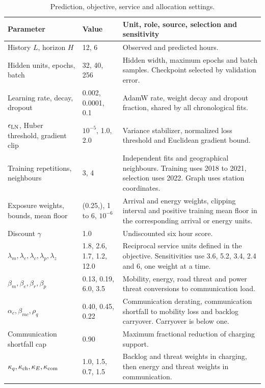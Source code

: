 \begin{table}[p]
\centering
\caption{Prediction, objective, service and allocation settings.}
\label{tab:complete-parameters}
\footnotesize\setlength{\tabcolsep}{4pt}\renewcommand{\arraystretch}{1.0}
\begin{tabular}{@{}p{}p{}p{}@{}}
\toprule Parameter & Value & Unit, role, source, selection and sensitivity \\ \midrule
History $L$, horizon $H$ & 12, 6 & Observed and predicted hours. \\
Hidden units, epochs, batch & 32, 40, 256 & Hidden width, maximum epochs and batch samples. Checkpoint selected by validation error. \\
Learning rate, decay, dropout & 0.002, 0.0001, 0.1 & AdamW rate, weight decay and dropout fraction, shared by all chronological fits. \\
$\epsilon_{\rm LN}$, Huber threshold, gradient clip & $10^{-5}$, 1.0, 2.0 & Variance stabilizer, normalized loss threshold and Euclidean gradient bound. \\
Training repetitions, neighbours & 3, 4 & Independent fits and geographical neighbours. Training uses 2018 to 2021, selection uses 2022. Graph uses station coordinates. \\
Exposure weights, bounds, mean floor & (0.25,\allowbreak 0.25), 1 to 6, $10^{-6}$ & Arrival and energy weights, clipping interval and positive training mean floor in the corresponding arrival or energy units. \\
Discount $\gamma$ & 1.0 & Undiscounted six hour score. \\
$\lambda_m,\lambda_e,\lambda_c,\lambda_p,\lambda_z$ & 1.8, 2.6, 1.7, 1.2, 12.0 & Reciprocal service units defined in the objective. Sensitivities use 3.6, 5.2, 3.4, 2.4 and 6, one weight at a time. \\
$\beta_m,\beta_e,\beta_r,\beta_p$ & 0.13, 0.19, 6.0, 3.5 & Mobility, energy, road threat and power threat conversions to communication load. \\
$\alpha_c,\beta_{mc},\rho_q$ & 0.40, 0.45, 0.22 & Communication derating, communication shortfall to mobility loss and backlog carryover. Carryover is below one. \\
Communication shortfall cap & 0.90 & Maximum fractional reduction of charging support. \\
$\kappa_q,\kappa_{\rm ch},\kappa_E,\kappa_{\rm com}$ & 1.0, 1.5, 0.7, 1.5 & Backlog and threat weights in charging, then energy and threat weights in communication. \\

\end{tabular}
\end{table}
